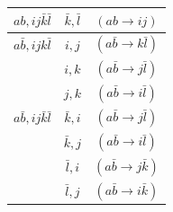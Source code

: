 \begin{table}
\begin{tabular}{ c|c|c }
		\hline
		\rule{0pt}{3ex} $ab,ij\bar k \bar l$                                                                               & $\bar k, \bar l$                                                                             & $(ab \rightarrow ij)$                                           \\
		                   
		\hline
		\rule{0pt}{3ex} $a\bar b,ijk \bar l$                                                                               & $i,j$                                                                                        & $(a \bar b\rightarrow k  \bar l)$                               \\
		                                                                                                   & $i,k$                                                                                        & $(a \bar b\rightarrow j  \bar l)$                               \\
		                                                                                                   & $j,k$                                                                                        & $(a \bar b\rightarrow i  \bar l)$                               \\
		                              
		\hline
		\rule{0pt}{3ex} $a\bar b,ij \bar k \bar l$                                                                         & $\bar k,i$                                                                                   & $(a \bar b \rightarrow j \bar l)$                               \\
		                                                                                                   & $\bar k,j$                                                                                   & $(a \bar b \rightarrow i \bar l)$                               \\
		                                                                                                   & $\bar l,i$                                                                                   & $(a \bar b \rightarrow j \bar k)$                               \\
		                                                                                                   & $\bar l,j$                                                                                   & $(a \bar b \rightarrow i \bar k)$                               \\
	\end{tabular} 
\end{table}



